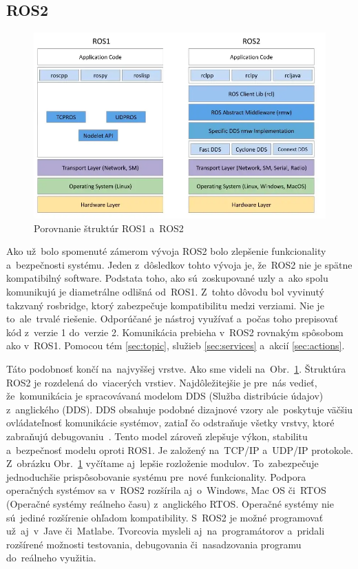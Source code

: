\subsection{ROS2}
\label{subsec:ros2}

\begin{figure}[!htbp]
	\centering
	\includegraphics[width=15cm]{img/strukturaRos1Ros2.png}
	\caption{Porovnanie štruktúr ROS1 a~ROS2~\cite{comparison}}
	\label{fig:struktury}
\end{figure}

Ako už~bolo spomenuté zámerom vývoja ROS2 bolo zlepšenie funkcionality a~bezpečnosti systému. Jeden z~dôsledkov tohto vývoja je, že~ROS2
nie je spätne kompatibilný software. Podstata toho, ako sú~zoskupované uzly a~ako spolu komunikujú je diametrálne odlišná od~ROS1. Z~tohto dôvodu
bol vyvinutý takzvaný rosbridge, ktorý zabezpečuje kompatibilitu medzi verziami. Nie je to~ale~trvalé riešenie. Odporúčané je nástroj
využívať a~počas toho prepisovať kód z~verzie 1 do~verzie 2. Komunikácia prebieha v~ROS2 rovnakým spôsobom ako v~ROS1. Pomocou tém
\ref{sec:topic}, služieb \ref{sec:services} a~akcií \ref{sec:actions}.

Táto podobnosť končí na~najvyššej vrstve. Ako sme videli na~Obr.~\ref{fig:struktury}. Štruktúra ROS2 je rozdelená do~viacerých vrstiev.
Najdôležitejšie je pre~nás vedieť, že~komunikácia je spracovávaná modelom DDS (Služba distribúcie údajov) z~anglického
(\acrlong{DDS}). DDS obsahuje podobné dizajnové vzory ale~poskytuje väčšiu ovládateľnosť komunikácie systémov, zatiaľ
čo odstraňuje všetky vrstvy, ktoré zabraňujú debugovaniu~\cite{ElectronicDesign}. Tento model zároveň zlepšuje výkon,
stabilitu a~bezpečnosť modelu oproti ROS1. Je založený na~TCP/IP a~UDP/IP protokole. Z~obrázku Obr.~\ref{fig:struktury}
vyčítame aj~lepšie rozloženie modulov. To~zabezpečuje jednoduchšie prispôsobovanie systému pre~nové funkcionality. Podpora operačných systémov
sa v~ROS2 rozšírila aj~o~Windows, Mac OS či~RTOS (Operačné systémy reálneho času) z~anglického \acrlong{RTOS}. Operačné systémy nie sú~jediné
rozšírenie ohľadom kompatibility. S~ROS2 je možné programovať už~aj~v~Jave či~Matlabe. Tvorcovia mysleli aj~na~programátorov a~pridali rozšírené
možnosti testovania, debugovania či~nasadzovania programu do~reálneho využitia.

